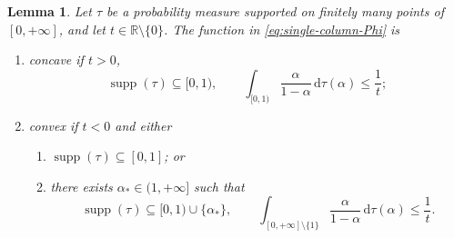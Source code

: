 \documentclass[aps,pra,11pt,onecolumn,nofootinbib,tightenlines]{revtex4-2}
\newtheorem{lemma}[theorem]{Lemma}
\theoremstyle{definition}
\begin{document}
\begin{lemma}
\label{lem:discrete-sufficient}
Let $\tau$ be a probability measure supported on finitely many points of $[0,+\infty]$, and let $t\in\mathbb R\setminus\{0\}$. The function in \eqref{eq:single-column-Phi} is
\begin{enumerate}
 \item concave if $t>0$,
 \begin{equation}
  \operatorname{supp}(\tau)\subseteq[0,1),
  \qquad
  \int_{[0,1)}\frac{\alpha}{1-\alpha}\,\mathrm d\tau(\alpha)
  \leq\frac1t;
  \label{eq:discrete-positive-condition}
 \end{equation}
 \item convex if $t<0$ and either
 \begin{enumerate}
  \item $\operatorname{supp}(\tau)\subseteq[0,1]$; or
  \item there exists $\alpha_*\in(1,+\infty]$ such that
  \begin{equation}
   \operatorname{supp}(\tau)\subseteq[0,1)\cup\{\alpha_*\},
   \qquad
   \int_{[0,+\infty]\setminus\{1\}}
   \frac{\alpha}{1-\alpha}\,\mathrm d\tau(\alpha)
   \leq\frac1t.
   \label{eq:discrete-negative-condition}
  \end{equation}
 \end{enumerate}
\end{enumerate}
\end{lemma}
\end{document}
